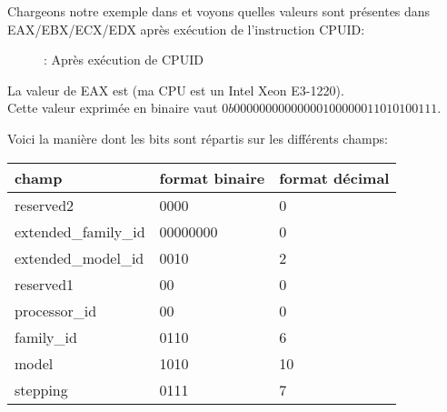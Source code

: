 ﻿\clearpage
{}
\myindex{\olly}

Chargeons notre exemple dans \olly et voyons quelles valeurs sont présentes dans EAX/EBX/ECX/EDX après 
exécution de l'instruction CPUID: 

\begin{figure}[H]
\centering
{}
\caption{\olly: Après exécution de CPUID}
\label{fig:cpuid_olly_1}
\end{figure}

La valeur de EAX est  (ma \ac{CPU} est un Intel Xeon E3-1220).\\
Cette valeur exprimée en binaire vaut $0b0000 0000 0000 0010 0000 0110 1010 0111$.

Voici la manière dont les bits sont répartis sur les différents champs:

\begin{center}
\begin{tabular}{ | l | l | l | }
\hline
\headercolor{} champ &
\headercolor{} format binaire &
\headercolor{} format décimal \\
\hline
reserved2		& 0000 & 0 \\
\hline
extended\_family\_id	& 00000000 & 0 \\
\hline
extended\_model\_id	& 0010 & 2 \\
\hline
reserved1		& 00 & 0 \\
\hline
processor\_id		& 00 & 0 \\
\hline
family\_id		& 0110 & 6 \\
\hline
model			& 1010 & 10 \\
\hline
stepping		& 0111 & 7 \\
\hline
\end{tabular}
\end{center}


